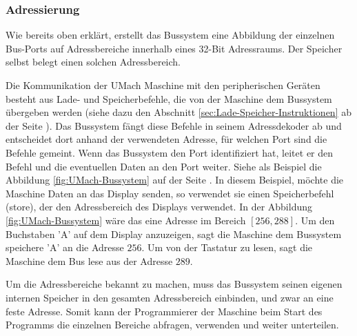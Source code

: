 \subsubsection{Adressierung}

Wie bereits oben erklärt, erstellt das Bussystem eine Abbildung der einzelnen
Bus-Ports auf Adressbereiche innerhalb eines 32-Bit Adressraums. Der Speicher
selbst belegt einen solchen Adressbereich.

Die Kommunikation der UMach Maschine mit den peripherischen Geräten besteht aus
Lade- und Speicherbefehle, die von der Maschine dem Bussystem übergeben werden
(siehe dazu den Abschnitt \ref{sec:Lade-Speicher-Instruktionen} ab der Seite
\pageref{sec:Lade-Speicher-Instruktionen}). Das Bussystem fängt diese Befehle in
seinem \gls{Adressdekoder} ab und entscheidet dort anhand der verwendeten
Adresse, für welchen Port sind die Befehle gemeint. Wenn das Bussystem den Port
identifiziert hat, leitet er den Befehl und die eventuellen Daten an den Port
weiter.
Siehe als Beispiel die Abbildung \ref{fig:UMach-Bussystem} auf der Seite
\pageref{fig:UMach-Bussystem}. In diesem Beispiel, möchte die Maschine Daten an
das Display senden, so verwendet sie einen Speicherbefehl (\glqq store\grqq),
der den Adressbereich des Displays verwendet. In der Abbildung
\ref{fig:UMach-Bussystem} wäre das eine Adresse im Bereich $[256, 288]$. Um den
Buchstaben 'A' auf dem Display anzuzeigen, sagt die Maschine dem Bussystem \glqq
speichere 'A' an die Adresse $256$\grqq. Um von der Tastatur zu lesen, sagt die
Maschine dem Bus \glqq lese aus der Adresse $289$\grqq.


Um die Adressbereiche bekannt zu machen, muss das Bussystem seinen eigenen
internen Speicher in den gesamten Adressbereich einbinden, und zwar an eine
feste Adresse. Somit kann der Programmierer der Maschine beim Start des
Programms die einzelnen Bereiche abfragen, verwenden und weiter unterteilen.











